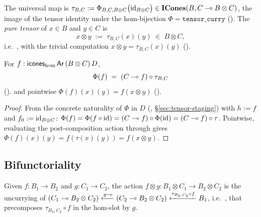 \begin{definition}\label{def:tau}
\rocqok
{}\rocqok
{}
The universal map is $\tau_{B,C} := \Phi_{B,C,B \otimes
C}\bigl(\mathrm{id}_{B \otimes C}\bigr) \in \mathbf{ICones}(B, C \multimap B \otimes C)$,
the image of the tensor identity under the hom-bijection $\Phi =
\texttt{tensor\_curry}$ (). The
\emph{pure tensor} of $x \in B$ and $y \in C$ is
\[
  x \otimes y \;:=\; \tau_{B,C}(x)(y) \;\in\; B \otimes C,
\]
i.e.\ , with the trivial computation
$x \otimes y = \tau_{B,C}(x)(y)$
().
\end{definition}

\begin{lemma}\label{lem:eq51}
\rocqok
{}
For $f : \mathsf{icones}_{\mathrm{hom}}\,\mathsf{Ar}\,(B \otimes C)\,D$,
\[
  \Phi(f) \;=\; (C \multimap f) \circ \tau_{B,C}
\]
().
and pointwise $\Phi(f)(x)(y) = f(x \otimes y)$
().
\end{lemma}

\begin{proof}
From the concrete naturality of $\Phi$ in $D$
(,
\S\ref{sec:tensor-staging}) with $h := f$
and $f_0 := \mathrm{id}_{B \otimes C}$: $\Phi(f) = \Phi(f \circ \mathrm{id}) = (C \multimap
f) \circ \Phi(\mathrm{id}) = (C \multimap f) \circ \tau$. Pointwise, evaluating the
post-composition action through
 gives $\Phi(f)(x)(y) =
f(\tau(x)(y)) = f(x \otimes y)$.
\end{proof}

\subsection{Bifunctoriality}\label{sec:tensor-mor}

\begin{definition}%
\label{def:tensor-mor}
\rocqok
{}
Given $f : B_1 \to B_2$ and $g : C_1 \to C_2$, the action $f \otimes g
: B_1 \otimes C_1 \to B_2 \otimes C_2$ is the uncurrying of $(C_1 \multimap
B_2 \otimes C_2) \xleftarrow{g \multimap} (C_2 \multimap B_2 \otimes C_2)
\xleftarrow{\tau_{B_2,C_2} \circ f} B_1$, i.e.\
, that precomposes
$\tau_{B_2,C_2} \circ f$ in the hom-slot by $g$.
\end{definition}


